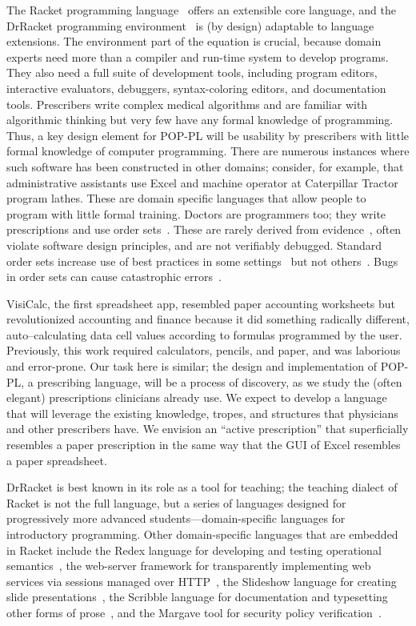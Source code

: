 The Racket programming language~\citep{Racket} offers an extensible
core language, and the DrRacket programming
environment~\citep{DrSchemeJFP} is (by design) adaptable to language
extensions. The environment part of the equation is crucial, because
domain experts need more than a compiler and run-time system to
develop programs. They also need a full suite of development tools,
including program editors, interactive evaluators, debuggers,
syntax-coloring editors, and documentation tools. Prescribers write
complex medical algorithms and are familiar with algorithmic thinking
but very few have any formal knowledge of programming. Thus, a key
design element for POP-PL will be usability by prescribers with little
formal knowledge of computer programming. There are numerous instances
where such software has been constructed in other domains; consider,
for example, that administrative assistants use Excel and machine
operator at Caterpillar Tractor program lathes. These are domain
specific languages that allow people to program with little formal
training. Doctors are programmers too; they write prescriptions and use
order sets~\cite{Elsberry1978,Honda1979,Kowalsky1982}. These are
rarely derived from evidence~\cite{Dranitsaris2001,Fonarow2007}, often
violate software design principles, and are not verifiably
debugged. Standard order sets increase use of best practices in some
settings~\cite{Girotti1990} but not others~\cite{Aswapokee1992}. Bugs in order
sets can cause catastrophic errors~\cite{Cohen1992}.

VisiCalc, the first spreadsheet app, resembled paper accounting
worksheets but revolutionized accounting and finance because it did
something radically different, auto–calculating data cell values
according to formulas programmed by the user. Previously, this work
required calculators, pencils, and paper, and was laborious and
error-prone. Our task here is similar; the design and implementation
of POP-PL, a prescribing language, will be a process of discovery, as
we study the (often elegant) prescriptions clinicians already use. We
expect to develop a language that will leverage the existing
knowledge, tropes, and structures that physicians and other
prescribers have. We envision an ``active prescription'' that
superficially resembles a paper prescription in the same way that the
GUI of Excel resembles a paper spreadsheet.

DrRacket is best known in its role as a tool for
teaching; the teaching dialect of Racket is not the full language, but a series of
languages designed for progressively more advanced
students---domain-specific languages for introductory programming.
Other domain-specific languages that are embedded in
Racket include the Redex language for developing and testing
operational semantics~\citep{Redex}, the web-server framework for
transparently implementing web services via sessions managed over
HTTP~\citep{web-server,mccarthy09,mccarthy10}, the Slideshow language
for creating slide presentations~\citep{Slideshow}, the Scribble
language for documentation and typesetting other forms of prose~\citep{Scribble}, and
the Margave tool for security policy verification~\citep{Margave}.

